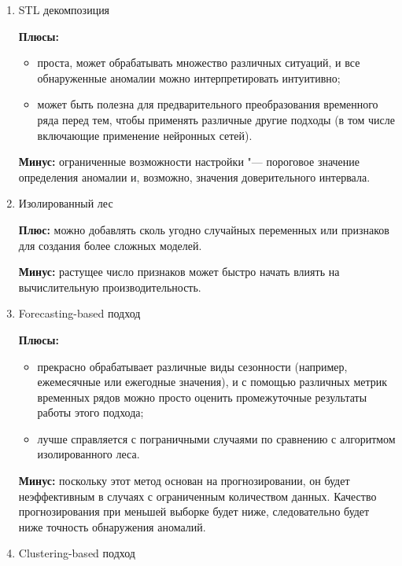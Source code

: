 \documentclass[bachelor, och, referat]{../shiza}
\begin{document}
    \begin{enumerate}
        \item STL декомпозиция
        
        \textbf{Плюсы:}
        \begin{itemize}
            \item проста, может обрабатывать множество различных ситуаций, и все
            обнаруженные аномалии можно интерпретировать интуитивно;
            \item может быть полезна для предварительного преобразования
            временного ряда перед тем, чтобы применять различные другие подходы
            (в том числе включающие применение нейронных сетей).
        \end{itemize}

        \textbf{Минус:} ограниченные возможности настройки "--- пороговое
        значение определения аномалии и, возможно, значения доверительного
        интервала.

        \item Изолированный лес
        
        \textbf{Плюс:} можно добавлять сколь угодно случайных переменных или
        признаков для создания более сложных моделей.

        \textbf{Минус:} растущее число признаков может быстро начать влиять на
        вычислительную производительность.

        \item Forecasting-based подход
        
        \textbf{Плюсы:}
        \begin{itemize}
            \item прекрасно обрабатывает различные виды сезонности (например,
            ежемесячные или ежегодные значения), и с помощью различных метрик
            временных рядов можно просто оценить промежуточные результаты работы
            этого подхода;
            \item лучше справляется с пограничными случаями по сравнению с
            алгоритмом изолированного леса.
        \end{itemize}

        \textbf{Минус:} поскольку этот метод основан на прогнозировании, он
        будет неэффективным в случаях с ограниченным количеством данных.
        Качество прогнозирования при меньшей выборке будет ниже, следовательно
        будет ниже точность обнаружения аномалий.

        \item Clustering-based подход
        

\end{enumerate}
\end{document}
